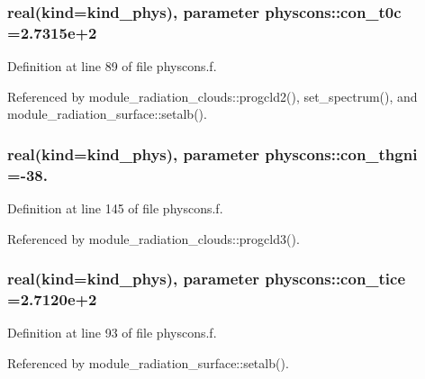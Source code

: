 \subsubsection[{\texorpdfstring{con\+\_\+t0c}{con_t0c}}]{\setlength{\rightskip}{0pt plus 5cm}real(kind=kind\+\_\+phys), parameter physcons\+::con\+\_\+t0c =2.\+7315e+2}\hypertarget{namespacephyscons_abdc3bd91e0599b1f58762612f02871e4}{}\label{namespacephyscons_abdc3bd91e0599b1f58762612f02871e4}


Definition at line 89 of file physcons.\+f.



Referenced by module\+\_\+radiation\+\_\+clouds\+::progcld2(), set\+\_\+spectrum(), and module\+\_\+radiation\+\_\+surface\+::setalb().

\subsubsection[{\texorpdfstring{con\+\_\+thgni}{con_thgni}}]{\setlength{\rightskip}{0pt plus 5cm}real(kind=kind\+\_\+phys), parameter physcons\+::con\+\_\+thgni =-\/38.}\hypertarget{namespacephyscons_a4d194dd8f216004f2f7b9e4521c2fe2c}{}\label{namespacephyscons_a4d194dd8f216004f2f7b9e4521c2fe2c}


Definition at line 145 of file physcons.\+f.



Referenced by module\+\_\+radiation\+\_\+clouds\+::progcld3().

\subsubsection[{\texorpdfstring{con\+\_\+tice}{con_tice}}]{\setlength{\rightskip}{0pt plus 5cm}real(kind=kind\+\_\+phys), parameter physcons\+::con\+\_\+tice =2.\+7120e+2}\hypertarget{namespacephyscons_af292f4e2670e56c932f2e2a80e33ef9f}{}\label{namespacephyscons_af292f4e2670e56c932f2e2a80e33ef9f}


Definition at line 93 of file physcons.\+f.



Referenced by module\+\_\+radiation\+\_\+surface\+::setalb().

